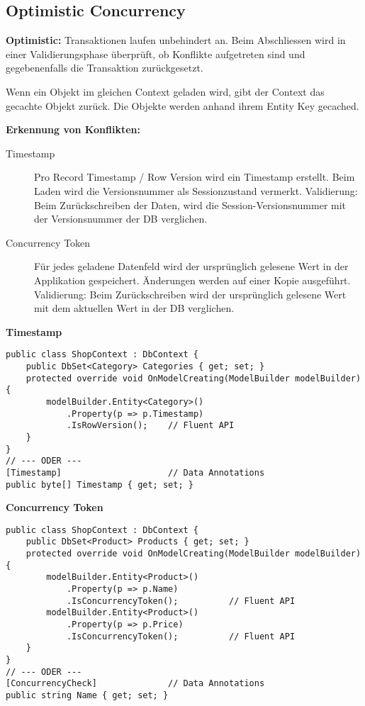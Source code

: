 \subsection{Optimistic Concurrency}
\textbf{Optimistic:} Transaktionen laufen unbehindert an. Beim Abschliessen wird in einer Validierungsphase überprüft, ob Konflikte aufgetreten sind und gegebenenfalls die Transaktion zurückgesetzt.

Wenn ein Objekt im gleichen Context geladen wird, gibt der Context das gecachte Objekt zurück. Die Objekte werden anhand ihrem Entity Key gecached.

\textbf{Erkennung von Konflikten:}
\begin{description}
  \item[Timestamp] Pro Record Timestamp / Row Version wird ein Timestamp erstellt. Beim Laden wird die Versionsnummer als Sessionzustand vermerkt. Validierung: Beim Zurückschreiben der Daten, wird die Session-Versionsnummer mit der Versionsnummer der DB verglichen.
  \item[Concurrency Token]  Für jedes geladene Datenfeld wird der ursprünglich gelesene Wert in der Applikation gespeichert. Änderungen werden auf einer Kopie ausgeführt. Validierung: Beim Zurückschreiben wird der ursprünglich gelesene Wert mit dem aktuellen Wert in der DB verglichen.
\end{description}

\textbf{Timestamp}
\begin{lstlisting}
public class ShopContext : DbContext {
    public DbSet<Category> Categories { get; set; }
    protected override void OnModelCreating(ModelBuilder modelBuilder) {
        modelBuilder.Entity<Category>()
            .Property(p => p.Timestamp)
            .IsRowVersion();    // Fluent API
    }
}
// --- ODER ---
[Timestamp]                     // Data Annotations
public byte[] Timestamp { get; set; }
\end{lstlisting}

\textbf{Concurrency Token} 
\begin{lstlisting}
public class ShopContext : DbContext {
    public DbSet<Product> Products { get; set; }
    protected override void OnModelCreating(ModelBuilder modelBuilder) {
        modelBuilder.Entity<Product>()
            .Property(p => p.Name)
            .IsConcurrencyToken();          // Fluent API
        modelBuilder.Entity<Product>()
            .Property(p => p.Price)
            .IsConcurrencyToken();          // Fluent API
    }
}
// --- ODER ---
[ConcurrencyCheck]              // Data Annotations
public string Name { get; set; }
\end{lstlisting}

